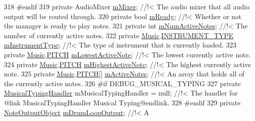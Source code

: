 \begin{DoxyCodeInclude}
318 \textcolor{comment}{}\textcolor{preprocessor}{    #endif}
319     \textcolor{keyword}{private} AudioMixer                 \hyperlink{group___v_i_m_priv_ga08c8db1bb89f4ab1e28451dd93d6b99c}{mMixer}; \textcolor{comment}{//!< The audio mixer that all audio output will be
       routed through.}
320 \textcolor{comment}{}    \textcolor{keyword}{private} \textcolor{keywordtype}{bool}                       \hyperlink{group___v_i_m_priv_ga983a11920bf16794735cc193c327ac42}{mReady}; \textcolor{comment}{//!< Whether or not the manager is ready to play
       notes.}
321 \textcolor{comment}{}    \textcolor{keyword}{private} \textcolor{keywordtype}{int}                        \hyperlink{group___v_i_m_priv_ga0f7e11945763c48057be326b661dfdaf}{mNumActiveNotes}; \textcolor{comment}{//!< The number of currently active
       notes.}
322 \textcolor{comment}{}    \textcolor{keyword}{private} \hyperlink{class_music}{Music}.\hyperlink{group___music_enums_gabfce60192305965558a36e368ebd67c3}{INSTRUMENT\_TYPE}      \hyperlink{group___v_i_m_priv_ga108c350257b3a2080e06cd4a8251f6a4}{mInstrumentType}; \textcolor{comment}{//!< The type of
       instrument that is currently loaded.}
323 \textcolor{comment}{}    \textcolor{keyword}{private} \hyperlink{class_music}{Music}.\hyperlink{group___music_enums_ga508f69b199ea518f935486c990edac1d}{PITCH}                \hyperlink{group___v_i_m_priv_ga5e3a5116e0dabb37e0ea21d73ac1567e}{mLowestActiveNote}; \textcolor{comment}{//!< The lowest
       currently active note.}
324 \textcolor{comment}{}    \textcolor{keyword}{private} \hyperlink{class_music}{Music}.\hyperlink{group___music_enums_ga508f69b199ea518f935486c990edac1d}{PITCH}                \hyperlink{group___v_i_m_priv_ga73a09a4e4f09c0e5b3871dc9ad6c757e}{mHighestActiveNote}; \textcolor{comment}{//!< The highest
       currently active note.}
325 \textcolor{comment}{}    \textcolor{keyword}{private} \hyperlink{class_music}{Music}.\hyperlink{group___music_enums_ga508f69b199ea518f935486c990edac1d}{PITCH}[]              \hyperlink{group___v_i_m_priv_ga5cedf9995d59b416412677e6004b659c}{mActiveNotes}; \textcolor{comment}{//!< An array that holds all of
       the currently active notes.}
326 \textcolor{comment}{}\textcolor{preprocessor}{    #if DEBUG\_MUSICAL\_TYPING}
327         \textcolor{keyword}{private} \hyperlink{class_musical_typing_handler}{MusicalTypingHandler}   mMusicalTypingHandler = null; \textcolor{comment}{//!< The handler
       for @link MusicalTypingHandler Musical Typing@endlink.}
328 \textcolor{comment}{}\textcolor{preprocessor}{    #endif}
329     \textcolor{keyword}{private} \hyperlink{class_note_output_object}{NoteOutputObject}           \hyperlink{group___v_i_m_priv_ga5f71cb71d240042312dcc13b481b068d}{mDrumLoopOutput}; \textcolor{comment}{//!< A
}
\end{DoxyCodeInclude}
